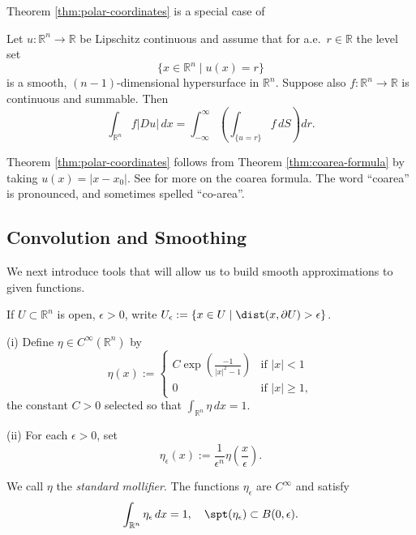 Theorem \ref{thm:polar-coordinates} is a special case of

\begin{theorem}
\label{thm:coarea-formula}
Let $u : \mathbb{R}^n \to \mathbb{R}$ be Lipschitz continuous and assume that for a.e.\ $r \in \mathbb{R}$ the level set
$$\{x \in \mathbb{R}^n \mid u(x) = r\}$$
is a smooth, $(n-1)$-dimensional hypersurface in $\mathbb{R}^n$. Suppose also $f : \mathbb{R}^n \to \mathbb{R}$ is continuous and summable. Then
$$\int_{\mathbb{R}^n} f|Du| \, dx = \int_{-\infty}^{\infty} \left(\int_{\{u=r\}} f \, dS\right) dr.$$
\end{theorem}

Theorem \ref{thm:polar-coordinates} follows from Theorem \ref{thm:coarea-formula} by taking $u(x) = |x - x_0|$. See \cite[Chapter 3]{EvansGariepy1992} for more on the coarea formula. The word ``coarea'' is pronounced, and sometimes spelled ``co-area''.

\subsection{Convolution and Smoothing}

We next introduce tools that will allow us to build smooth approximations to given functions.

\begin{definition}
\label{def:epsilon-interior-set-notation}
If $U \subset \mathbb{R}^n$ is open, $\epsilon > 0$, write $U_\epsilon := \{x \in U \mid \dist(x, \partial U) > \epsilon\}$.
\end{definition}

\begin{definition}
\label{def:standard-mollifier}
(i) Define $\eta \in C^\infty(\mathbb{R}^n)$ by
$$\eta(x) := \begin{cases} C \exp\left(\frac{-1}{|x|^2-1}\right) & \text{if } |x| < 1 \\ 0 & \text{if } |x| \geq 1, \end{cases}$$
the constant $C > 0$ selected so that $\int_{\mathbb{R}^n} \eta \, dx = 1$.

(ii) For each $\epsilon > 0$, set
$$\eta_\epsilon(x) := \frac{1}{\epsilon^n} \eta\left(\frac{x}{\epsilon}\right).$$

We call $\eta$ the \textit{standard mollifier}. The functions $\eta_\epsilon$ are $C^\infty$ and satisfy
$$\int_{\mathbb{R}^n} \eta_\epsilon \, dx = 1, \quad \spt(\eta_\epsilon) \subset B(0,\epsilon).$$
\end{definition}


